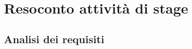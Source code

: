 
\chapter{Resoconto attività di stage}
\label{cap:stage}

\section{Analisi dei requisiti}

\section{}